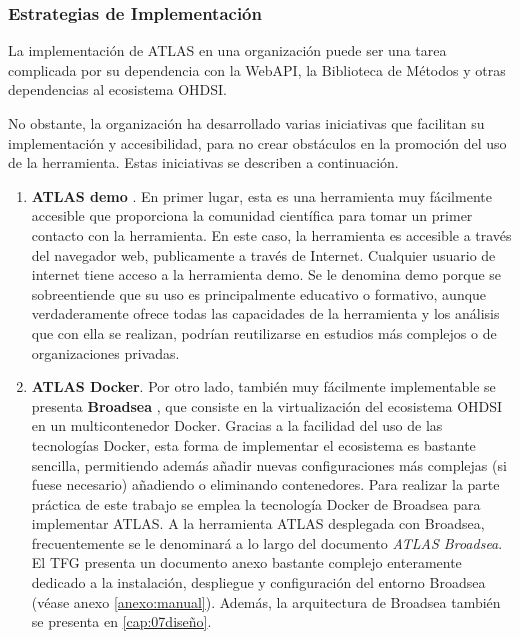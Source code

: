 \subsubsection{Estrategias de Implementación}

La implementación de ATLAS en una organización puede ser una tarea complicada por su dependencia con la WebAPI, la Biblioteca de Métodos y otras dependencias al ecosistema OHDSI. 

No obstante, la organización ha desarrollado varias iniciativas que facilitan su implementación y accesibilidad, para no crear obstáculos en la promoción del uso de la herramienta. Estas iniciativas se describen a continuación.

\begin{enumerate}[label=\alph*.]

    \item \textbf{ATLAS demo} \cite{ATLASdemo}. En primer lugar, esta es una herramienta muy fácilmente accesible que proporciona la comunidad científica para tomar un primer contacto con la herramienta. En este caso, la herramienta es accesible a través del navegador web, publicamente a través de Internet. Cualquier usuario de internet tiene acceso a la herramienta demo. Se le denomina demo porque se sobreentiende que su uso es principalmente educativo o formativo, aunque verdaderamente ofrece todas las capacidades de la herramienta y los análisis que con ella se realizan, podrían reutilizarse en estudios más complejos o de organizaciones privadas.

    \item \textbf{ATLAS Docker}. Por otro lado, también muy fácilmente implementable se presenta \textbf{Broadsea} \cite{githubBroadsea}, que consiste en la virtualización del ecosistema OHDSI en un multicontenedor Docker. Gracias a la facilidad del uso de las tecnologías Docker, esta forma de implementar el ecosistema es bastante sencilla, permitiendo además añadir nuevas configuraciones más complejas (si fuese necesario) añadiendo o eliminando contenedores. Para realizar la parte práctica de este trabajo se emplea la tecnología Docker de Broadsea para implementar ATLAS. A la herramienta ATLAS desplegada con Broadsea, frecuentemente se le denominará a lo largo del documento \textit{ATLAS Broadsea}. El TFG presenta un documento anexo bastante complejo enteramente dedicado a la instalación, despliegue y configuración del entorno Broadsea (véase anexo \ref{anexo:manual}). Además, la arquitectura de Broadsea también se presenta en \ref{cap:07diseño}.


\end{enumerate}
